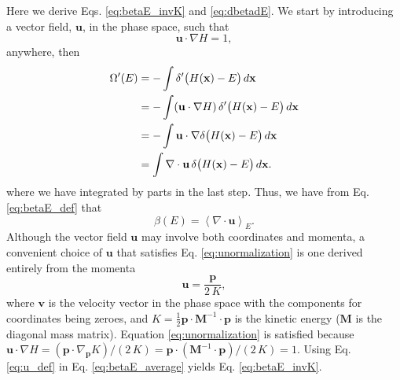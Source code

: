 \documentclass[reprint]{revtex4-1}
\begin{document}
Here we derive Eqs. \eqref{eq:betaE_invK} and \eqref{eq:dbetadE}.
We start by introducing a vector field, $\mathbf u$,
in the phase space,
such that
%
\begin{equation}
  \mathbf u \cdot \nabla H = 1
  ,
  \label{eq:unormalization}
\end{equation}
%
anywhere, then
%
\begin{align}
  \Omega'(E)
  &= -\int \delta'\bigl( H(\mathbf x) - E \bigr) \, d\mathbf x
     \notag \\
  &= -\int (\mathbf u \cdot \nabla H) \,
           \delta'\bigl( H(\mathbf x) - E \bigr) \, d\mathbf x
     \notag \\
  &= -\int \mathbf u \cdot
           \nabla \delta\bigl( H(\mathbf x) - E \bigr) \, d\mathbf x
     \notag \\
  &= \int \nabla \cdot \mathbf u \,
     \delta\bigl( H(\mathbf x) - E \bigr) \, d\mathbf x
  .
  \notag
\end{align}
%
where we have integrated by parts in the last step.
%
Thus, we have from Eq. \eqref{eq:betaE_def} that
%
\begin{equation}
  \beta(E)
  =
  \left\langle
    \nabla \cdot \mathbf u
  \right\rangle_E
  .
  \label{eq:betaE_average}
\end{equation}
%
Although the vector field $\mathbf u$ may involve both coordinates and momenta,
a convenient choice of $\mathbf u$ that satisfies
Eq. \eqref{eq:unormalization}
is one derived entirely from the momenta
%
\begin{equation}
  \mathbf u
  =
  \frac{ \mathbf p }
       {  2 \, K }
  ,
  \label{eq:u_def}
\end{equation}
where $\mathbf v$ is the velocity vector in the phase space
with the components for coordinates being zeroes,
and $K = \frac 1 2 \mathbf p \cdot \mathbf M^{-1} \cdot \mathbf p$
is the kinetic energy ($\mathbf M$ is the diagonal mass matrix).
%
Equation \eqref{eq:unormalization} is satisfied
because
$\mathbf u \cdot \nabla H
= (\mathbf p \cdot \nabla_{\mathbf p} K)/(2 \, K)
= \mathbf p \cdot (\mathbf M^{-1} \cdot \mathbf p) / (2 \, K) = 1$.
%
Using Eq. \eqref{eq:u_def} in Eq. \eqref{eq:betaE_average}
yields Eq. \eqref{eq:betaE_invK}.
\end{document}
